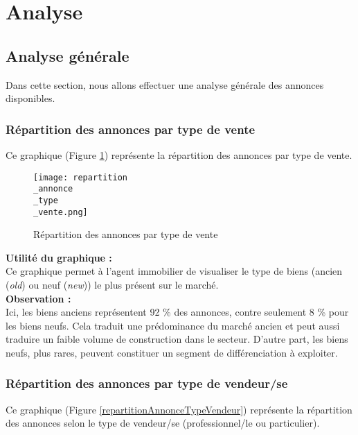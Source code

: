 \documentclass[a4paper, 12pt, twoside]{report}
\begin{document}
	\section{Analyse}

		\subsection{Analyse générale}
		
		Dans cette section, nous allons effectuer une analyse générale des annonces disponibles.

			\subsubsection{Répartition des annonces par type de vente}

			Ce graphique (Figure \ref{repartitionAnnonceTypeVente}) représente la répartition des annonces par type de vente. \\

			\begin{figure}[h]
				\centering
				\texttt{[image: repartition\\\_annonce\\\_type\\\_vente.png]}
				\caption{Répartition des annonces par type de vente}
				\label{repartitionAnnonceTypeVente}
			\end{figure}

			{\bf Utilité du graphique :} \\

			Ce graphique permet à l’agent immobilier de visualiser le type de biens (ancien ({\it old}) ou neuf ({\it new})) le plus présent sur le marché. \\

			{\bf Observation :} \\

			Ici, les biens anciens représentent 92 \% des annonces, contre seulement 8 \% pour les biens neufs. Cela traduit une prédominance du marché ancien et peut aussi traduire un faible volume de construction dans le secteur. D’autre part, les biens neufs, plus rares, peuvent constituer un segment de différenciation à exploiter.

			\subsubsection{Répartition des annonces par type de vendeur/se}

			Ce graphique (Figure \ref{repartitionAnnonceTypeVendeur}) représente la répartition des annonces selon le type de vendeur/se (professionnel/le ou particulier). \\
\end{document}
